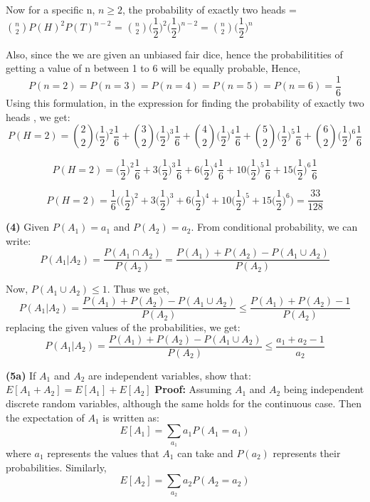 \documentclass{article}
\renewcommand\part[1]{\vspace{.10in}\textbf{(#1)}}
\begin{document}
  Now for a specific n, $n \geq 2 $, the probability of exactly two heads = $\binom{n}{2} P(H)^2P(T)^{n-2}$ = $\binom{n}{2}\bigg (\dfrac{1}{2} \bigg )^2 \bigg ( \dfrac{1}{2} \bigg)^{n-2} = \binom{n}{2}\bigg ( \dfrac{1}{2} \bigg)^n$

  Also, since the we are given an unbiased fair dice, hence the probabilitities of getting a value of n between 1 to 6 will be equally probable, Hence, 
  \[ P(n=2) = P(n=3) = P(n=4) = P(n=5) = P(n=6) = \dfrac{1}{6} \]
  Using this formulation, in the expression for finding the probability of exactly two heads , we get:
  \[P(H=2) = \binom{2}{2}\bigg ( \dfrac{1}{2} \bigg )^2\dfrac{1}{6} + \binom{3}{2}\bigg ( \dfrac{1}{2} \bigg )^3\dfrac{1}{6} + \binom{4}{2}\bigg ( \dfrac{1}{2} \bigg )^4\dfrac{1}{6} + \binom{5}{2}\bigg ( \dfrac{1}{2} \bigg )^5\dfrac{1}{6} + \binom{6}{2}\bigg ( \dfrac{1}{2} \bigg )^6\dfrac{1}{6}\]

  \[P(H=2) = \bigg ( \dfrac{1}{2} \bigg )^2\dfrac{1}{6} + 3\bigg ( \dfrac{1}{2} \bigg )^3\dfrac{1}{6} + 6\bigg ( \dfrac{1}{2} \bigg )^4\dfrac{1}{6} + 10\bigg ( \dfrac{1}{2} \bigg )^5\dfrac{1}{6} + 15\bigg ( \dfrac{1}{2} \bigg )^6\dfrac{1}{6}\]

  \[P(H=2) = \dfrac{1}{6} \bigg (\bigg ( \dfrac{1}{2} \bigg )^2 + 3\bigg ( \dfrac{1}{2} \bigg )^3 + 6\bigg ( \dfrac{1}{2} \bigg )^4 + 10\bigg ( \dfrac{1}{2} \bigg )^5 + 15\bigg ( \dfrac{1}{2} \bigg )^6 \bigg ) = \dfrac{33}{128}\]

  \part{4} 
  Given $P(A_1) = a_1$ and $P(A_2) = a_2$. From conditional probability, we can write: 
  \[P(A_1 | A_2) = \dfrac{P(A_1 \cap A_2)}{P(A_2)} = \dfrac{P(A_1) + P(A_2) - P(A_1 \cup A_2)}{P(A_2)} \]

  Now, $P(A_1 \cup A_2) \leq 1$. Thus we get,
  \[P(A_1 | A_2) = \dfrac{P(A_1) + P(A_2) - P(A_1 \cup A_2)}{P(A_2)} \leq \dfrac{P(A_1) + P(A_2) - 1}{P(A_2)} \]
  replacing the given values of the probabilities, we get: \newline
  \[P(A_1 | A_2) = \dfrac{P(A_1) + P(A_2) - P(A_1 \cup A_2)}{P(A_2)} \leq \dfrac{a_1 + a_2 - 1}{a_2} \]


  \part{5a} If $A_1$ and $A_2$ are independent variables, show that: $E[A_1 + A_2] = E[A_1] + E[A_2]$ \newline
  \textbf{Proof:} Assuming $A_1$ and $A_2$ being independent discrete random variables, although the same holds for the continuous case.
  Then the expectation of $A_1$ is written as:
  \[E[A_1] = \sum_{a_1} a_1P(A_1 = a_1)\]
  where $a_1$ represents the values that $A_1$ can take and $P(a_2)$ represents their probabilities. Similarly,
  \[E[A_2] = \sum_{a_2} a_2P(A_2 = a_2) \]
\end{document}

